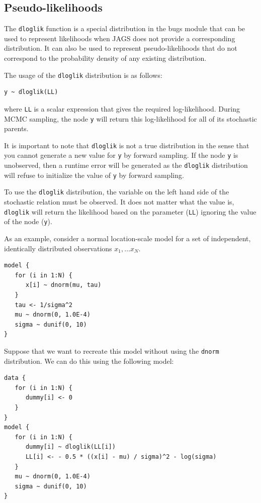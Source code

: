 \documentclass[11pt, a4paper, titlepage]{report}
\begin{document}
{\subsection{Pseudo-likelihoods}
\label{section:bugs:dloglik}

The \texttt{dloglik} function is a special distribution in the bugs
module that can be used to represent likelihoods when JAGS does not
provide a corresponding distribution. It can also be used to represent
pseudo-likelihoods that do not correspond to the probability density
of any existing distribution.

The usage of the \texttt{dloglik} distribution is as follows:
\begin{verbatim}
y ~ dloglik(LL)
\end{verbatim}
where \texttt{LL} is a scalar expression that gives the required
log-likelihood. During MCMC sampling, the node \texttt{y} will return
this log-likelihood for all of its stochastic parents.

It is important to note that \texttt{dloglik} is not a true
distribution in the sense that you cannot generate a new value for
\texttt{y} by forward sampling. If the node \texttt{y} is unobserved,
then a runtime error will be generated as the \texttt{dloglik}
distribution will refuse to initialize the value of \texttt{y} by
forward sampling.

To use the \texttt{dloglik} distribution, the variable on the left
hand side of the stochastic relation must be observed. It does not
matter what the value is, \texttt{dloglik} will return the likelihood
based on the parameter (\texttt{LL}) ignoring the value of the node
(\texttt{y}).

As an example, consider a normal location-scale model for a set of
independent, identically distributed observations $x_1, \ldots x_N$.

\begin{verbatim}
model {
   for (i in 1:N) {
      x[i] ~ dnorm(mu, tau)
   }
   tau <- 1/sigma^2
   mu ~ dnorm(0, 1.0E-4)
   sigma ~ dunif(0, 10)
}
\end{verbatim}

Suppose that we want to recreate this model without using the
\texttt{dnorm} distribution. We can do this using the following model:

\begin{verbatim}
data {
   for (i in 1:N) {
      dummy[i] <- 0
   }
}
model {
   for (i in 1:N) {
      dummy[i] ~ dloglik(LL[i])
      LL[i] <- - 0.5 * ((x[i] - mu) / sigma)^2 - log(sigma)
   }
   mu ~ dnorm(0, 1.0E-4)
   sigma ~ dunif(0, 10)
}
\end{verbatim}

}
\end{document}
